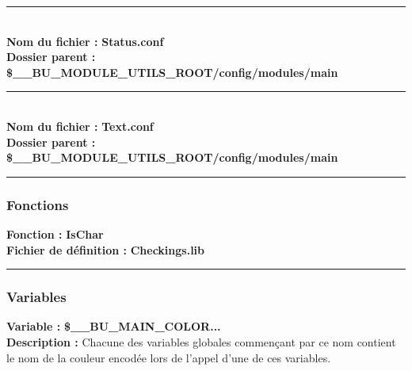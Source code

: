 \documentclass[a4paper,10pt]{article}
\begin{document}
\color{lime}\par\noindent\rule{\textwidth}{0.4pt}\color{white}\\[1\baselineskip]

\textbf{Nom du fichier :} \textbf{\color{lime}Status.conf\color{white}}\\[1\baselineskip]
\textbf{Dossier parent :} \textbf{\color{lime}\$\_\_BU\_MODULE\_UTILS\_ROOT/config/modules/main\color{white}}\\[1\baselineskip]



\color{lime}\par\noindent\rule{\textwidth}{0.4pt}\color{white}\\[1\baselineskip]

\textbf{Nom du fichier :} \textbf{\color{lime}Text.conf\color{white}}\\[1\baselineskip]
\textbf{Dossier parent :} \textbf{\color{lime}\$\_\_BU\_MODULE\_UTILS\_ROOT/config/modules/main\color{white}}\\[1\baselineskip]




\color{blue}\par\noindent\rule{\textwidth}{0.4pt}\color{white}

\color{blue}
\subsubsection{Fonctions}\color{white}
\textbf{Fonction :} \textbf{\color{mauve}IsChar\color{white}}\\[1\baselineskip]

\textbf{Fichier de définition :} \textbf{\color{lime}Checkings.lib\color{white}}\\[1\baselineskip]



\color{blue}\par\noindent\rule{\textwidth}{0.4pt}\color{white}

\color{blue}
\subsubsection{Variables}\color{white}
\textbf{Variable :} \textbf{\color{orange}\$\_\_BU\_MAIN\_COLOR...\color{white}}\\[1\baselineskip]

\textbf{Description :} Chacune des variables globales commençant par ce nom contient le nom de la couleur encodée lors de l'appel d'une de ces variables.\\[1\baselineskip]
\end{document}
